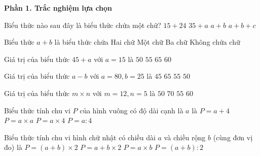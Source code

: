 \textbf{Phần 1. Trắc nghiệm lựa chọn}

\begin{ex} %
Biểu thức nào sau đây là biểu thức chứa một chữ?
\choice
{$15 + 24$}
{\True $35 + a$}
{$a + b$}
{$a + b + c$}
\end{ex}

\begin{ex} %
Biểu thức $a + b$ là biểu thức chứa
\choice
{\True Hai chữ}
{Một chữ}
{Ba chữ}
{Không chứa chữ}
\end{ex}

\begin{ex} %
Giá trị của biểu thức $45 + a$ với $a = 15$ là
\choice
{$50$}
{$55$}
{$65$}
{\True $60$}
\end{ex}

\begin{ex} %
Giá trị của biểu thức $a - b$ với $a = 80, b = 25$ là
\choice
{$45$}
{$65$}
{\True $55$}
{$50$}
\end{ex}

\begin{ex} %
Giá trị của biểu thức $m \times n$ với $m = 12, n = 5$ là
\choice
{$50$}
{$70$}
{$55$}
{\True $60$}
\end{ex}

\begin{ex} %
Biểu thức tính chu vi $P$ của hình vuông có độ dài cạnh là $a$ là
\choice
{$P = a + 4$}
{$P = a \times a$}
{\True $P = a \times 4$}
{$P = a : 4$}
\end{ex}

\begin{ex} %
Biểu thức tính chu vi hình chữ nhật có chiều dài $a$ và chiều rộng $b$ (cùng đơn vị đo) là
\choice
{\True $P = (a + b) \times 2$}
{$P = a + b \times 2$}
{$P = a \times b$}
{$P = (a + b) : 2$}
\end{ex}

